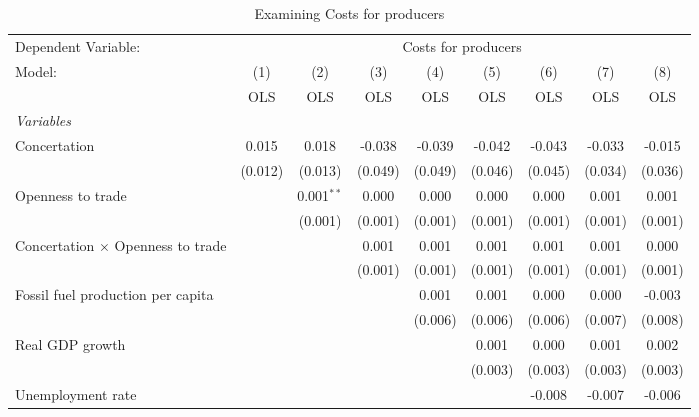 
\begin{table}[htbp]
   \caption{Examining Costs for producers}
   \centering
   \begin{tabular}{lcccccccc}
      \toprule
      Dependent Variable: & \multicolumn{8}{c}{Costs for producers}\\
      Model:                                   & (1)     & (2)          & (3)     & (4)     & (5)     & (6)     & (7)     & (8)\\  
                                               &  OLS    & OLS          & OLS     & OLS     & OLS     & OLS     & OLS     & OLS\\  
      \midrule
      \emph{Variables}\\
      Concertation                             & 0.015   & 0.018        & -0.038  & -0.039  & -0.042  & -0.043  & -0.033  & -0.015\\   
                                               & (0.012) & (0.013)      & (0.049) & (0.049) & (0.046) & (0.045) & (0.034) & (0.036)\\   
      Openness to trade                        &         & 0.001$^{**}$ & 0.000   & 0.000   & 0.000   & 0.000   & 0.001   & 0.001\\   
                                               &         & (0.001)      & (0.001) & (0.001) & (0.001) & (0.001) & (0.001) & (0.001)\\   
      Concertation $\times$ Openness to trade  &         &              & 0.001   & 0.001   & 0.001   & 0.001   & 0.001   & 0.000\\   
                                               &         &              & (0.001) & (0.001) & (0.001) & (0.001) & (0.001) & (0.001)\\   
      Fossil fuel production per capita        &         &              &         & 0.001   & 0.001   & 0.000   & 0.000   & -0.003\\   
                                               &         &              &         & (0.006) & (0.006) & (0.006) & (0.007) & (0.008)\\   
      Real GDP growth                          &         &              &         &         & 0.001   & 0.000   & 0.001   & 0.002\\   
                                               &         &              &         &         & (0.003) & (0.003) & (0.003) & (0.003)\\   
      Unemployment rate                        &         &              &         &         &         & -0.008  & -0.007  & -0.006\\   

\end{tabular}
\end{table}
